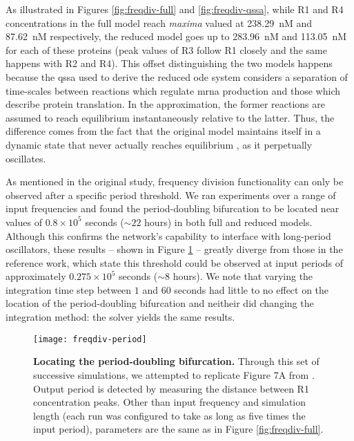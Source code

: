     As illustrated in Figures \ref{fig:freqdiv-full} and \ref{fig:freqdiv-qssa}, while R1 and R4 concentrations in the full model reach \textit{maxima} valued at \SI{238.29}{\nano M} and \SI{87.62}{\nano M} respectively, the reduced model goes up to \SI{283.96}{\nano M} and \SI{113.05}{\nano M} for each of these proteins (peak values of R3 follow R1 closely and the same happens with R2 and R4).
    This offset distinguishing the two models happens because the \ac{qssa} used to derive the reduced \ac{ode} system considers a separation of time-scales between reactions which regulate \acs{mrna} production and those which describe protein translation.
    In the approximation, the former reactions are assumed to reach equilibrium instantaneously relative to the latter.
    Thus, the difference comes from the fact that the original model maintains itself in a dynamic state that never actually reaches equilibrium \cite{ingalls}, as it perpetually oscillates.

    As mentioned in the original study, frequency division functionality can only be observed after a specific period threshold.
    We ran experiments over a range of input frequencies and found the period-doubling bifurcation to be located near values of $0.8 \times 10^5$ seconds ($\sim 22$ hours) in both full and reduced models.
    Although this confirms the network's capability to interface with long-period oscillators, these results -- shown in Figure \ref{fig:freqdiv-period} -- greatly diverge from those in the reference work, which state this threshold could be observed at input periods of approximately $0.275 \times 10^5$ seconds ($\sim 8$ hours).
    We note that varying the integration time step between $1$ and $60$ seconds had little to no effect on the location of the period-doubling bifurcation and neitheir did changing the integration method: the  solver yields the same results.

    \begin{figure}[!htb]
      \centering
      \texttt{[image: freqdiv-period]}
      \caption{\textbf{Locating the period-doubling bifurcation.} Through this set of successive simulations, we attempted to replicate Figure 7A from \citet{multif}. Output period is detected by measuring the distance between R1 concentration peaks. Other than input frequency and simulation length (each run was configured to take as long as five times the input period), parameters are the same as in Figure \ref{fig:freqdiv-full}.}
      \label{fig:freqdiv-period}
    \end{figure}



